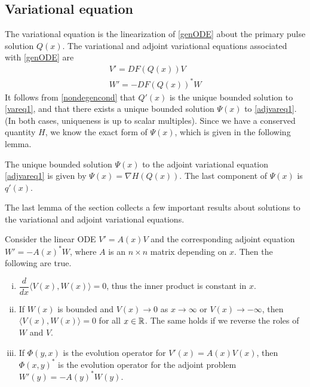 \documentclass[thesis.tex]{subfiles}
\begin{document}
\subsection{Variational equation}\label{sec:vareq1}

The variational equation is the linearization of \cref{genODE} about the primary pulse solution $Q(x)$. The variational and adjoint variational equations associated with \cref{genODE} are
\begin{align}
V' = DF(Q(x)) V \label{vareq1} \\
W' = -DF(Q(x))^* W \label{adjvareq1}
\end{align}
It follows from \cref{nondegencond} that $Q'(x)$ is the unique bounded solution to \cref{vareq1}, and that there exists a unique bounded solution $\Psi(x)$ to \cref{adjvareq1}. (In both cases, uniqueness is up to scalar multiples). Since we have a conserved quantity $H$, we know the exact form of $\Psi(x)$, which is given in the following lemma.

\begin{lemma}\label{psiform}
The unique bounded solution $\Psi(x)$ to the adjoint variational equation \cref{adjvareq1} is given by $\Psi(x) = \nabla H(Q(x))$. The last component of $\Psi(x)$ is $q'(x)$.
\end{lemma}

The last lemma of the section collects a few important results about solutions to the variational and adjoint variational equations.

\begin{lemma}\label{eigadjoint}
Consider the linear ODE $V' = A(x)V$ and the corresponding adjoint equation $W' = -A(x)^* W$, where $A$ is an $n \times n$ matrix depending on $x$. Then the following are true.
\begin{enumerate}[(i)]
\item $\dfrac{d}{dx}\langle V(x), W(x) \rangle = 0$, thus the inner product is constant in $x$.
\item If $W(x)$ is bounded and $V(x) \rightarrow 0$ as $x \rightarrow \infty$ or $V(x) \rightarrow -\infty$, then $\langle V(x), W(x) \rangle = 0$ for all $x \in \mathbb{R}$. The same holds if we reverse the roles of $W$ and $V$.
\item If $\Phi(y, x)$ is the evolution operator for $V'(x) = A(x)V(x)$, then $\Phi(x, y)^*$ is the evolution operator for the adjoint problem $W'(y) = -A(y)^* W(y)$.
\end{enumerate}
\end{lemma}
\end{document}
